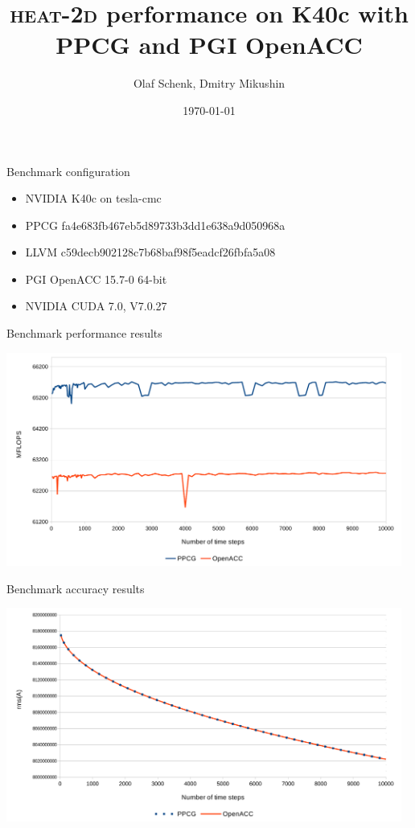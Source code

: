 \documentclass[aspectratio=169]{beamer}
\title[\textsc{\scriptsize heat-2d} on K40c with PPCG and PGI OpenACC]{\textsc{\huge heat-2d} performance on K40c with PPCG and PGI OpenACC}
\author{Olaf Schenk, Dmitry Mikushin}
\date{\today}
\begin{document}
\begin{frame}
\titlepage
\end{frame}



\begin{frame}[fragile]{Benchmark configuration}

\begin{itemize}
\item NVIDIA K40c on tesla-cmc
\item PPCG fa4e683fb467eb5d89733b3dd1e638a9d050968a
\item LLVM c59decb902128c7b68baf98f5eadcf26fbfa5a08
\item PGI OpenACC 15.7-0 64-bit
\item NVIDIA CUDA 7.0, V7.0.27
\end{itemize}

\end{frame}



\begin{frame}[fragile]{Benchmark performance results}

\includegraphics[width=13cm]{figures/tesla_k40}

\end{frame}



\begin{frame}[fragile]{Benchmark accuracy results}

\includegraphics[width=13cm]{figures/tesla_k40_rms}

\end{frame}
\end{document}
